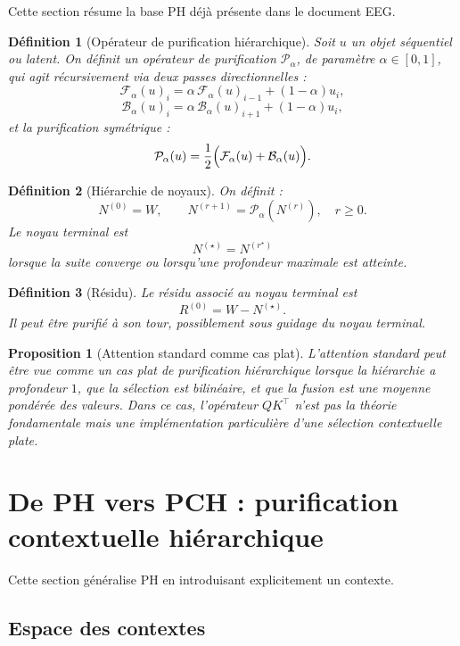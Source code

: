 \documentclass[11pt,a4paper]{article}
\newtheorem{definition}{Définition}[section]
\newtheorem{proposition}{Proposition}[section]
\newcommand{\Pcal}{\mathcal P}
\newcommand{\1}{\mathbf 1}
\begin{document}
Cette section résume la base PH déjà présente dans le document EEG.

\begin{definition}[Opérateur de purification hiérarchique]
Soit \(u\) un objet séquentiel ou latent. On définit un opérateur de purification \(\Pcal_\alpha\), de paramètre \(\alpha\in[0,1]\), qui agit récursivement via deux passes directionnelles :
\[
\mathcal F_\alpha(u)_i
=
\alpha\,\mathcal F_\alpha(u)_{i-1}
+
(1-\alpha)u_i,
\]
\[
\mathcal B_\alpha(u)_i
=
\alpha\,\mathcal B_\alpha(u)_{i+1}
+
(1-\alpha)u_i,
\]
et la purification symétrique :
\[
\Pcal_\alpha(u)
=
\frac12\Bigl(\mathcal F_\alpha(u)+\mathcal B_\alpha(u)\Bigr).
\]
\end{definition}

\begin{definition}[Hiérarchie de noyaux]
On définit :
\[
N^{(0)} = W,
\qquad
N^{(r+1)} = \Pcal_\alpha\!\left(N^{(r)}\right),
\quad r\ge 0.
\]
Le noyau terminal est
\[
N^{(\star)} = N^{(r^\star)}
\]
lorsque la suite converge ou lorsqu'une profondeur maximale est atteinte.
\end{definition}

\begin{definition}[Résidu]
Le résidu associé au noyau terminal est
\[
R^{(0)} = W - N^{(\star)}.
\]
Il peut être purifié à son tour, possiblement sous guidage du noyau terminal.
\end{definition}

\begin{proposition}[Attention standard comme cas plat]
L'attention standard peut être vue comme un cas plat de purification hiérarchique lorsque la hiérarchie a profondeur \(1\), que la sélection est bilinéaire, et que la fusion est une moyenne pondérée des valeurs.
Dans ce cas, l'opérateur \(QK^\top\) n'est pas la théorie fondamentale mais une implémentation particulière d'une sélection contextuelle plate.
\end{proposition}

\section{De PH vers PCH : purification contextuelle hiérarchique}

Cette section généralise PH en introduisant explicitement un contexte.

\subsection{Espace des contextes}
\end{document}
